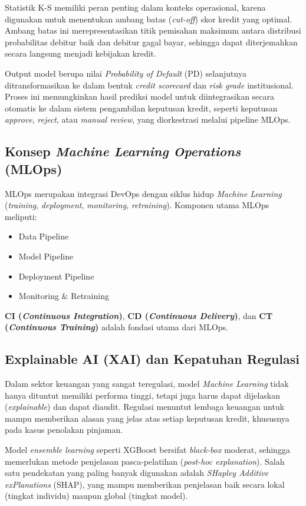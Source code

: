Statistik K-S memiliki peran penting dalam konteks operasional, karena digunakan untuk menentukan ambang batas (\textit{cut-off}) skor kredit yang optimal. Ambang batas ini merepresentasikan titik pemisahan maksimum antara distribusi probabilitas debitur baik dan debitur gagal bayar, sehingga dapat diterjemahkan secara langsung menjadi kebijakan kredit.

Output model berupa nilai \textit{Probability of Default} (PD) selanjutnya ditransformasikan ke dalam bentuk \textit{credit scorecard} dan \textit{risk grade} institusional. Proses ini memungkinkan hasil prediksi model untuk diintegrasikan secara otomatis ke dalam sistem pengambilan keputusan kredit, seperti keputusan \textit{approve}, \textit{reject}, atau \textit{manual review}, yang diorkestrasi melalui pipeline MLOps.\cite{nikolaidis2022credit}


\subsection{Konsep \textit{Machine Learning Operations} (MLOps)}
MLOps merupakan integrasi DevOps dengan siklus hidup \textit{Machine Learning} (\textit{training}, \textit{deployment}, \textit{monitoring}, \textit{retraining}). Komponen utama MLOps meliputi:
\begin{itemize}
    \item Data Pipeline
    \item Model Pipeline
    \item Deployment Pipeline
    \item Monitoring \& Retraining
\end{itemize}
\textbf{CI (\textit{Continuous Integration})}, \textbf{CD (\textit{Continuous Delivery})}, dan \textbf{CT (\textit{Continuous Training})} adalah fondasi utama dari MLOps.\cite{Nogare2023}

\subsection{Explainable AI (XAI) dan Kepatuhan Regulasi}

Dalam sektor keuangan yang sangat teregulasi, model \textit{Machine Learning} tidak hanya dituntut memiliki performa tinggi, tetapi juga harus dapat dijelaskan (\textit{explainable}) dan dapat diaudit. Regulasi menuntut lembaga keuangan untuk mampu memberikan alasan yang jelas atas setiap keputusan kredit, khususnya pada kasus penolakan pinjaman.

Model \textit{ensemble learning} seperti XGBoost bersifat \textit{black-box} moderat, sehingga memerlukan metode penjelasan pasca-pelatihan (\textit{post-hoc explanation}). Salah satu pendekatan yang paling banyak digunakan adalah \textit{SHapley Additive exPlanations} (SHAP), yang mampu memberikan penjelasan baik secara lokal (tingkat individu) maupun global (tingkat model).\cite{yotsawat2021improved}

